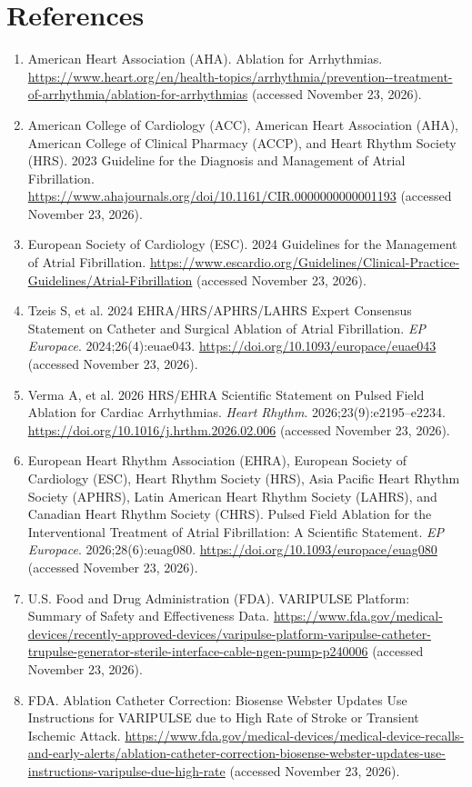 \section*{References}
\begin{enumerate}
  \item American Heart Association (AHA). Ablation for Arrhythmias. \url{https://www.heart.org/en/health-topics/arrhythmia/prevention--treatment-of-arrhythmia/ablation-for-arrhythmias} (accessed November 23, 2026).
  \item American College of Cardiology (ACC), American Heart Association (AHA), American College of Clinical Pharmacy (ACCP), and Heart Rhythm Society (HRS). 2023 Guideline for the Diagnosis and Management of Atrial Fibrillation. \url{https://www.ahajournals.org/doi/10.1161/CIR.0000000000001193} (accessed November 23, 2026).
  \item European Society of Cardiology (ESC). 2024 Guidelines for the Management of Atrial Fibrillation. \url{https://www.escardio.org/Guidelines/Clinical-Practice-Guidelines/Atrial-Fibrillation} (accessed November 23, 2026).
  \item Tzeis S, et al. 2024 EHRA/HRS/APHRS/LAHRS Expert Consensus Statement on Catheter and Surgical Ablation of Atrial Fibrillation. \textit{EP Europace}. 2024;26(4):euae043. \url{https://doi.org/10.1093/europace/euae043} (accessed November 23, 2026).
  \item Verma A, et al. 2026 HRS/EHRA Scientific Statement on Pulsed Field Ablation for Cardiac Arrhythmias. \textit{Heart Rhythm}. 2026;23(9):e2195--e2234. \url{https://doi.org/10.1016/j.hrthm.2026.02.006} (accessed November 23, 2026).
  \item European Heart Rhythm Association (EHRA), European Society of Cardiology (ESC), Heart Rhythm Society (HRS), Asia Pacific Heart Rhythm Society (APHRS), Latin American Heart Rhythm Society (LAHRS), and Canadian Heart Rhythm Society (CHRS). Pulsed Field Ablation for the Interventional Treatment of Atrial Fibrillation: A Scientific Statement. \textit{EP Europace}. 2026;28(6):euag080. \url{https://doi.org/10.1093/europace/euag080} (accessed November 23, 2026).
  \item U.S. Food and Drug Administration (FDA). VARIPULSE Platform: Summary of Safety and Effectiveness Data. \url{https://www.fda.gov/medical-devices/recently-approved-devices/varipulse-platform-varipulse-catheter-trupulse-generator-sterile-interface-cable-ngen-pump-p240006} (accessed November 23, 2026).
  \item FDA. Ablation Catheter Correction: Biosense Webster Updates Use Instructions for VARIPULSE due to High Rate of Stroke or Transient Ischemic Attack. \url{https://www.fda.gov/medical-devices/medical-device-recalls-and-early-alerts/ablation-catheter-correction-biosense-webster-updates-use-instructions-varipulse-due-high-rate} (accessed November 23, 2026).
\end{enumerate}

\clearpage
